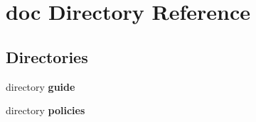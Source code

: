 \section{doc Directory Reference}
\label{dir_e68e8157741866f444e17edd764ebbae}
\subsection*{Directories}
\begin{DoxyCompactItemize}
\item 
directory {\bf guide}
\item 
directory {\bf policies}
\end{DoxyCompactItemize}
